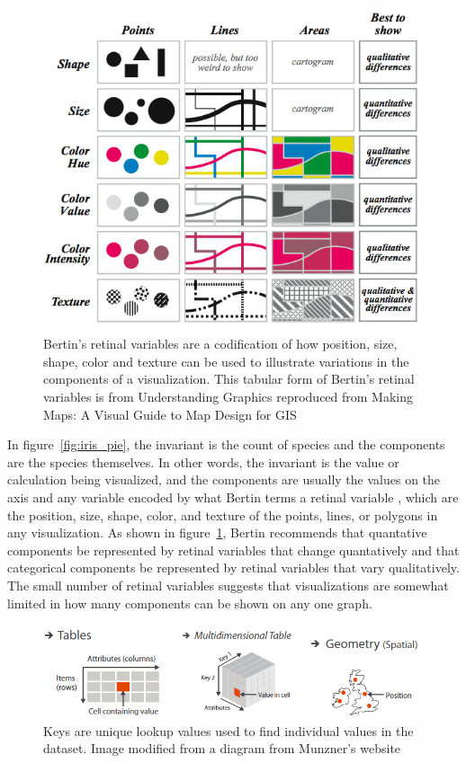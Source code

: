 \documentclass[letterpaper,onecolumn,titlepage]{Ythesis}
\begin{document}
\begin{figure}
\includegraphics[width=1\textwidth]{intro/retinal_variables.png}
\caption{Bertin's retinal variables are a codification of how position, size, shape, color and texture can be used to illustrate variations in the components of a visualization. This tabular form of Bertin's retinal variables is from Understanding Graphics \cite{_information_????} reproduced from Making Maps: A Visual Guide to Map Design for GIS \cite{krygier_making_2005}}
\label{fig:retinal_variables}
\end{figure}

In figure~\ref{fig:iris_pie}, the invariant is the count of species and the components are the species themselves. In other words, the invariant is the value or calculation being visualized, and the components are usually the values on the axis and any variable encoded by what Bertin terms a retinal variable \cite{bertin_semiology_2011,krygier_making_2005}, which are the position, size, shape, color, and texture of the points, lines, or polygons in any visualization. As shown in figure~\ref{fig:retinal_variables}, Bertin recommends that quantative components be represented by retinal variables that change quantatively and that categorical components be represented by retinal variables that vary qualitatively. The small number of retinal variables suggests that visualizations are somewhat limited in how many components can be shown on any one graph.


\begin{figure}
 \includegraphics[width=\textwidth]{intro/munzner_datatypes}
\caption{Keys are unique lookup values used to find individual values in the dataset. Image modified from a diagram from Munzner's website \cite{_visualization_????}}
\label{fig:munzner_datatypes}
\end{figure}
\end{document}
